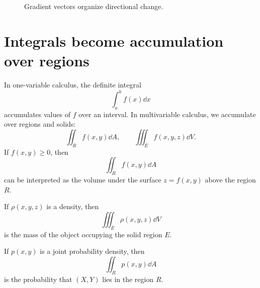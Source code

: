 \begin{figure}[H]
\centering
{}
\caption{Gradient vectors organize directional change.}
\label{fig:gradient-on-contours-tikz}
\end{figure}

\section{Integrals become accumulation over regions}

In one-variable calculus, the definite integral
\[
  \int_a^b f(x)\dd x
\]
accumulates values of $f$ over an interval. In multivariable calculus, we accumulate over regions and solids:
\[
  \iint_R f(x,y)\dd A,
  \qquad
  \iiint_E f(x,y,z)\dd V.
\]
If $f(x,y)\ge0$, then
\[
  \iint_R f(x,y)\dd A
\]
can be interpreted as the volume under the surface $z=f(x,y)$ above the region $R$.

If $\rho(x,y,z)$ is a density, then
\[
  \iiint_E \rho(x,y,z)\dd V
\]
is the mass of the object occupying the solid region $E$.

If $p(x,y)$ is a joint probability density, then
\[
  \iint_R p(x,y)\dd A
\]
is the probability that $(X,Y)$ lies in the region $R$.

